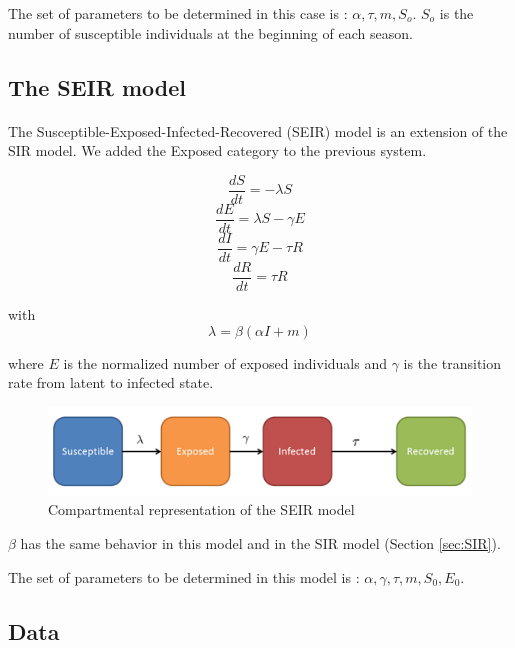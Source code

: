 \documentclass[11pt, a4paper]{article}
\begin{document}
The set of parameters to be determined in this case is : $ {\alpha, \tau, m, S_o}$. $S_o$ is the number of susceptible individuals at the beginning of each season.

\subsection{The SEIR model}
\paragraph{}
The Susceptible-Exposed-Infected-Recovered (SEIR) model is an extension of the SIR model. We added the Exposed category to the previous system.

\begin{equation}
\frac{dS}{dt} = - \lambda S
\end{equation}
\begin{equation}
\frac{dE}{dt} = \lambda S - \gamma E
\end{equation}
\begin{equation}
\frac{dI}{dt} = \gamma E - \tau R
\end{equation}
\begin{equation}
\frac{dR}{dt} = \tau R
\end{equation}

with \[ \lambda = \beta (\alpha I + m) \]

where $E$ is the normalized number of exposed individuals and $\gamma$ is the transition rate from latent to infected state.

\begin{figure}[h]
\FloatBarrier
\center
   \includegraphics[width = \textwidth]{figures/picture2.png}
   \caption{Compartmental representation of the SEIR model}
   \label{SEIRcr}
\end{figure}

$\beta$ has the same behavior in this model and in the SIR model (Section \ref{sec:SIR}).

The set of parameters to be determined in this model is : $ { \alpha, \gamma, \tau, m, S_0, E_0}$. 

\subsection{Data}
\end{document}
